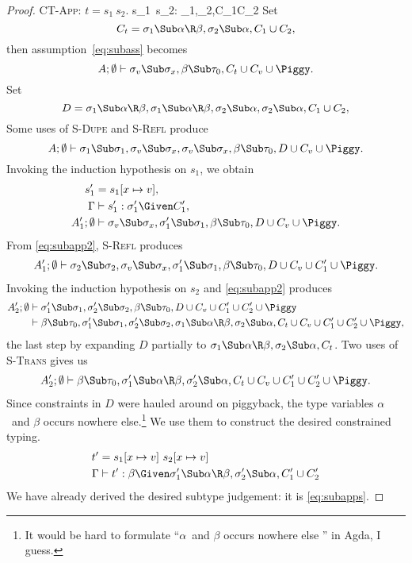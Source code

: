 \documentclass{amsart}
\theoremstyle{definition}
\begin{document}
\begin{proof}
\Case\textsc{CT-App}: $t=s_1~s_2$.
{\Gamma\vdash s_1~s_2:\beta\Given
\sigma_1\Sub\alpha\R\beta,\sigma_2\Sub\alpha,C_1\cup C_2
}
Set
\[
C_t=\sigma_1\Sub\alpha\R\beta,\sigma_2\Sub\alpha,C_1\cup C_2,
\]
then assumption~\eqref{eq:subass} becomes
\[
A;\emptyset\vdash
  \sigma_v\Sub\sigma_x,
  \beta\Sub\tau_0,
  C_t\cup C_v\cup\Piggy.
\]
Set
\[
D=
\sigma_1\Sub\alpha\R\beta,
\sigma_1\Sub\alpha\R\beta,
\sigma_2\Sub\alpha,
\sigma_2\Sub\alpha,C_1\cup C_2,
\]
Some uses of \textsc{S-Dupe} and \textsc{S-Refl} produce
\[
A;\emptyset\vdash
  \sigma_1\Sub\sigma_1,
  \sigma_v\Sub\sigma_x,\sigma_v\Sub\sigma_x,
  \beta\Sub\tau_0,
  D\cup C_v\cup\Piggy.
\]
Invoking the induction hypothesis on $s_1$, we obtain
\begin{align}
s_1'&=s_1[x\mapsto v]\notag,
\\
\Gamma&\vdash s_1' : \sigma_1' \Given C_1',
\label{eq:subapp1}
\\
A_1';\emptyset&\vdash
  \sigma_v\Sub\sigma_x,
  \sigma_1'\Sub\sigma_1,
  \beta\Sub\tau_0,
  D\cup C_v\cup\Piggy.
\label{eq:subapp2}
\end{align}
From \eqref{eq:subapp2}, \textsc{S-Refl} produces
\begin{align}
A_1';\emptyset\vdash
  \sigma_2\Sub\sigma_2,
  \sigma_v\Sub\sigma_x,
  \sigma_1'\Sub\sigma_1,
  \beta\Sub\tau_0,
  D\cup C_v\cup C_1'\cup\Piggy.
\label{eq:subappf}
\end{align}
Invoking the induction hypothesis on $s_2$ and \eqref{eq:subapp2}
produces
\begin{align}
A_2';\emptyset&\vdash
  \sigma_1'\Sub\sigma_1,
  \sigma_2'\Sub\sigma_2,
  \beta\Sub\tau_0,
  D\cup C_v\cup C_1'\cup C_2'\cup\Piggy
\notag\\
&\vdash
  \beta\Sub\tau_0,
  \sigma_1'\Sub\sigma_1,
  \sigma_2'\Sub\sigma_2,
  \sigma_1\Sub\alpha\R\beta,\sigma_2\Sub\alpha,
  C_t\cup C_v\cup C_1'\cup C_2'\cup\Piggy,
\notag
\end{align}
the last step by expanding $D$ partially to
$\sigma_1\Sub\alpha\R\beta,\sigma_2\Sub\alpha,C_t$.
Two uses of \textsc{S-Trans} gives us
\begin{align}
A_2';\emptyset\vdash
  \beta\Sub\tau_0,
  \sigma_1'\Sub\alpha\R\beta,\sigma_2'\Sub\alpha,
  C_t\cup C_v\cup C_1'\cup C_2'\cup\Piggy.
\label{eq:subapps}
\end{align}
Since constraints in $D$ were hauled around on piggyback, the
type variables $\alpha$~and $\beta$ occurs nowhere
else.\footnote{ It would be hard to formulate ``$\alpha$~and
$\beta$ occurs nowhere else '' in Agda, I guess.
%
}%
We use them to construct the desired constrained typing.
\begin{align}
t'&=s_1[x\mapsto v]~s_2[x\mapsto v]
\notag\\
\Gamma&\vdash t':
\beta\Given
\sigma_1'\Sub\alpha\R\beta,\sigma_2'\Sub\alpha,
C_1'\cup C_2'
\notag
\end{align}
We have already derived the desired subtype judgement: it is
\eqref{eq:subapps}.
\end{proof}


\end{document}
